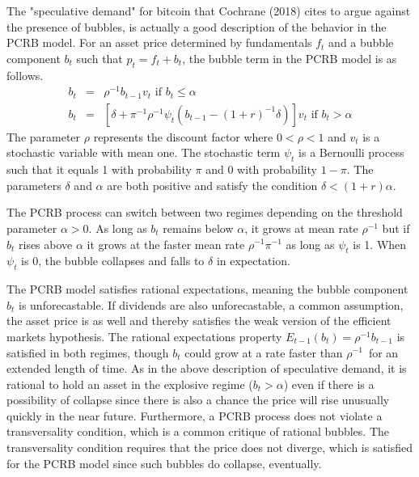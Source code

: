\documentclass{article}
\begin{document}
The "speculative demand" for bitcoin that Cochrane (2018) cites to argue
against the presence of bubbles, is actually a good description of the
behavior in the PCRB model. For an asset price determined by fundamentals $%
f_{t}$ and a bubble component $b_{t}$ such that $p_{t}=f_{t}+b_{t}$, the
bubble term in the PCRB model is as follows.%
\begin{eqnarray*}
b_{t} &=&\rho ^{-1}b_{t-1}v_{t}\text{ \ \ \ \ if }b_{t}\leq \alpha \\
b_{t} &=&\left[ \delta +\pi ^{-1}\rho ^{-1}\psi _{t}\left( b_{t-1}-\left(
1+r\right) ^{-1}\delta \right) \right] v_{t}\text{ \ \ \ \ if }b_{t}>\alpha
\end{eqnarray*}%
The parameter $\rho$ represents the discount factor where $0<\rho <1$ and $%
v_{t}$ is a stochastic variable with mean one. The stochastic term $\psi
_{t}$ is a Bernoulli process such that it equals 1 with probability $\pi $
and 0 with probability $1-\pi $. The parameters $\delta$ and $\alpha $
are both positive and satisfy the condition $\delta <\left( 1+r\right)
\alpha $.

The PCRB process can switch between two regimes depending on the threshold
parameter $\alpha >0$. As long as $b_{t}$ remains below $\alpha $, it
grows at mean rate $\rho ^{-1}$ but if $b_{t}$ rises above $\alpha $ it
grows at the faster mean rate $\rho ^{-1}\pi ^{-1}$ as long as $\psi _{t}$
is 1. When $\psi _{t}$ is 0, the bubble collapses and falls to $\delta $
in expectation.

The PCRB model satisfies rational expectations, meaning the bubble component
$b_{t}$ is unforecastable. If dividends are also unforecastable, a common
assumption, the asset price is as well and thereby satisfies the weak
version of the efficient markets hypothesis. The rational expectations
property $E_{t-1}\left( b_{t}\right) =\rho ^{-1}b_{t-1}$ is satisfied in
both regimes, though $b_{t}$ could grow at a rate faster than $\rho ^{-1}$\
for an extended length of time. As in the above description of speculative
demand, it is rational to hold an asset in the explosive regime ($%
b_{t}>\alpha $) even if there is a possibility of collapse since there is
also a chance the price will rise unusually quickly in the near future.
Furthermore, a PCRB process does not violate a transversality condition,
which is a common critique of rational bubbles. The transversality
condition requires that the price does not diverge, which is satisfied for
the PCRB model since such bubbles do collapse, eventually.
\end{document}
